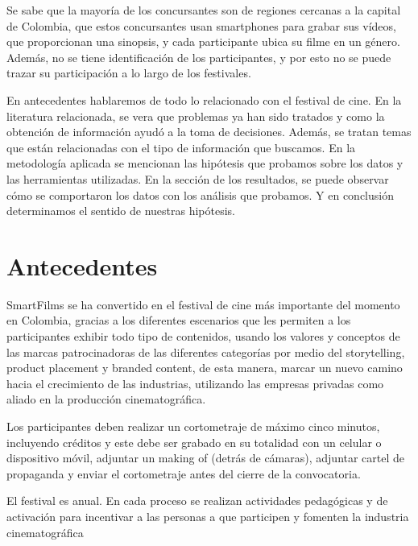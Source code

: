 \documentclass[5p,times]{elsarticle}
\begin{document}
Se sabe que la mayoría de los concursantes son de regiones cercanas a la capital de Colombia, que estos concursantes usan smartphones para grabar sus vídeos, que proporcionan una sinopsis, y cada participante ubica su filme en un género. Además, no se tiene identificación de los participantes, y por esto no se puede trazar su participación a lo largo de los festivales.

En antecedentes hablaremos de todo lo relacionado con el festival de cine. En la literatura relacionada, se vera que problemas ya han sido tratados y como la obtención de información ayudó a la toma de decisiones. Además, se tratan temas que están relacionadas con el tipo de información que buscamos. En la metodología aplicada se mencionan las hipótesis que probamos sobre los datos y las herramientas utilizadas. En la sección de los resultados, se puede observar cómo se comportaron los datos con los análisis que probamos. Y en conclusión determinamos el sentido de nuestras hipótesis.

\section*{Antecedentes}
SmartFilms \cite{smartfilms} se ha convertido en el festival de cine más importante del momento en Colombia, gracias a los diferentes escenarios que les permiten a los participantes exhibir todo tipo de contenidos, usando los valores y conceptos de las marcas patrocinadoras de las diferentes categorías por medio del storytelling, product placement y branded content, de esta manera, marcar un nuevo camino hacia el crecimiento de las industrias, utilizando las empresas privadas como aliado en la producción cinematográfica.

Los participantes deben realizar un cortometraje de máximo cinco minutos, incluyendo créditos y este debe ser grabado en su totalidad con un celular o dispositivo móvil, adjuntar un making of (detrás de cámaras), adjuntar cartel de propaganda y enviar el cortometraje antes del cierre de la convocatoria.

El festival es anual. En cada proceso se realizan actividades pedagógicas y de activación para incentivar a las personas a que participen y fomenten la industria cinematográfica
\end{document}

